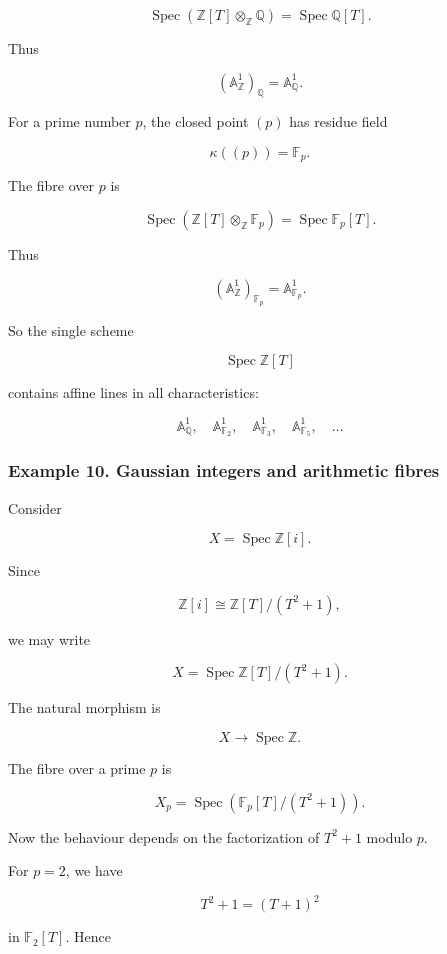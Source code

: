 \documentclass[12pt,a4paper]{article}
\theoremstyle{notespace}
\begin{document}
\[
\operatorname{Spec}\left(\mathbb{Z}[T]\otimes_{\mathbb{Z}}\mathbb{Q}\right)
=
\operatorname{Spec}\mathbb{Q}[T].
\]

Thus

\[
(\mathbb{A}^1_{\mathbb{Z}})_{\mathbb{Q}}
=
\mathbb{A}^1_{\mathbb{Q}}.
\]

For a prime number \(p\), the closed point \((p)\) has residue field

\[
\kappa((p))=\mathbb{F}_p.
\]

The fibre over \(p\) is

\[
\operatorname{Spec}\left(\mathbb{Z}[T]\otimes_{\mathbb{Z}}\mathbb{F}_p\right)
=
\operatorname{Spec}\mathbb{F}_p[T].
\]

Thus

\[
(\mathbb{A}^1_{\mathbb{Z}})_{\mathbb{F}_p}
=
\mathbb{A}^1_{\mathbb{F}_p}.
\]

So the single scheme

\[
\operatorname{Spec}\mathbb{Z}[T]
\]

contains affine lines in all characteristics:

\[
\mathbb{A}^1_{\mathbb{Q}},
\quad
\mathbb{A}^1_{\mathbb{F}_2},
\quad
\mathbb{A}^1_{\mathbb{F}_3},
\quad
\mathbb{A}^1_{\mathbb{F}_5},
\quad
\ldots
\]

\subsubsection{Example 10. Gaussian integers and arithmetic fibres}

Consider

\[
X=\operatorname{Spec}\mathbb{Z}[i].
\]

Since

\[
\mathbb{Z}[i]\cong \mathbb{Z}[T]/(T^2+1),
\]

we may write

\[
X=\operatorname{Spec}\mathbb{Z}[T]/(T^2+1).
\]

The natural morphism is

\[
X\to \operatorname{Spec}\mathbb{Z}.
\]

The fibre over a prime \(p\) is

\[
X_p
=
\operatorname{Spec}\left(\mathbb{F}_p[T]/(T^2+1)\right).
\]

Now the behaviour depends on the factorization of \(T^2+1\) modulo \(p\).

For \(p=2\), we have

\[
T^2+1=(T+1)^2
\]

in \(\mathbb{F}_2[T]\). Hence
\end{document}
